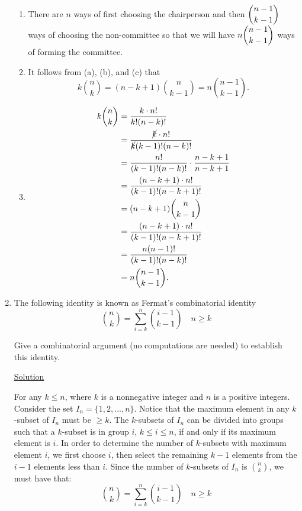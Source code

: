 \begin{enumerate}
\begin{enumerate}
\item There are $n$ ways of first choosing the chairperson and then
$\dbinom{n - 1}{k - 1}$ ways of choosing the non-committee so that we will have
$n\dbinom{n - 1}{k - 1}$ ways of forming the committee.

\item It follows from (a), (b), and (c) that
\[k\binom{n}{k} = (n - k + 1)\binom{n}{k - 1} = n\binom{n - 1}{k - 1}.\]

\item
\begin{align*}
k\binom{n}{k} &= \frac{k \cdot n!}{k!(n - k)!} \\
&= \frac{\cancel{k} \cdot n!}{\cancel{k}(k - 1)!(n - k)!} \\
&= \frac{n!}{(k - 1)!(n - k)!} \cdot \frac{n - k + 1}{n - k + 1} \\
&= \frac{(n - k + 1) \cdot n!}{(k - 1)!(n - k + 1)!} \\
& = (n - k + 1)\binom{n}{k - 1} \\
&= \frac{(n - k + 1) \cdot n!}{(k - 1)!(n - k + 1)!} \\
&= \frac{n(n - 1)!}{(k - 1)!(n - k)!} \\
&= n\binom{n - 1}{k - 1}.
\end{align*}
\end{enumerate}

\item The following identity is known as Fermat's combinatorial identity
\[\binom{n}{k} = \sum_{i=k}^n\binom{i - 1}{k - 1} \quad n \ge k\]

Give a combinatorial argument (no computations are needed) to establish this
identity.

\underline{Solution}

For any $k \le n$, where $k$ is a nonnegative integer and $n$ is a positive
integers. Consider the set $I_n = \{1, 2, \ldots, n\}$. Notice that the maximum
element in any $k$-subset of $I_n$ must be $\ge k.$ The $k$-subsets of $I_n$ 
can be divided into groups such that a $k$-subset is in group $i$,
$k \le i \le n$, if and only if its maximum element is $i$. In order to
determine the number of $k$-subsets with maximum element $i$, we first choose
$i$, then select the remaining $k - 1$ elements from the $i - 1$ elements less
than $i$. Since the number of $k$-subsets of $I_n$ is $\binom{n}{k}$, we must
have that:
\[\binom{n}{k} = \sum_{i=k}^n\binom{i - 1}{k - 1} \quad n \ge k\]


\end{enumerate}
